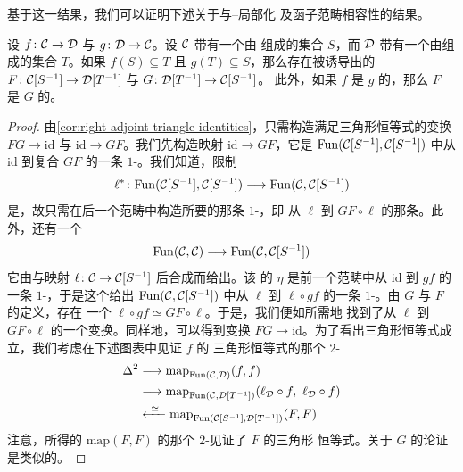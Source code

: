 基于这一结果，我们可以证明下述关于\trAdjunction{}与\trDwyer{}--\trKan{}局部化
及函子范畴相容性的结果。

\begin{proposition}\label{prop:adjunction-localization}
设 $f\colon \mathcal{C} \to \mathcal{D}$ 与 $g\colon \mathcal{D} \to \mathcal{C}$。设 $\mathcal{C}$ 带有一个由\trMorphism{}%
组成的集合 $S$，而 $\mathcal{D}$ 带有一个由\trMorphism{}组成的集合 $T$。如果
$f(S) \subseteq T$ 且 $g(T) \subseteq S$，那么存在被诱导出的\trFunctor{}%
$F\colon \mathcal{C}[S^{-1}] \to \mathcal{D}[T^{-1}]$ 与 $G\colon \mathcal{D}[T^{-1}] \to \mathcal{C}[S^{-1}]$。
此外，如果 $f$ 是 $g$ 的\trLeftAdjoint{}，那么 $F$ 是 $G$ 的\trLeftAdjoint{}。
\end{proposition}

\begin{proof}
由\cref{cor:right-adjoint-triangle-identities}，只需构造满足三角形恒等式的变换
$FG \to \mathrm{id}$ 与 $\mathrm{id} \to GF$。我们先构造映射
$\mathrm{id} \to GF$，它是 $\mathrm{Fun}(\mathcal{C}[S^{-1}], \mathcal{C}[S^{-1}])$ 中从
$\mathrm{id}$ 到复合 $GF$ 的一条 $1$-\trSimplex{}。我们知道，限制\trFunctor{}%
\[
\ell^*\colon \mathrm{Fun}(\mathcal{C}[S^{-1}], \mathcal{C}[S^{-1}])
  \longrightarrow \mathrm{Fun}(\mathcal{C}, \mathcal{C}[S^{-1}])
\]
是\trFullyFaithful{}，故只需在后一个范畴中构造所要的那条 $1$-\trSimplex{}，即
从 $\ell$ 到 $GF \circ \ell$ 的那条。此外，还有一个\trFunctor{}%
\[
\mathrm{Fun}(\mathcal{C}, \mathcal{C}) \longrightarrow \mathrm{Fun}(\mathcal{C}, \mathcal{C}[S^{-1}])
\]
它由与\trLocalization{}映射 $\ell\colon \mathcal{C} \to \mathcal{C}[S^{-1}]$ 后合成而给出。该%
\trAdjunction{}的\trUnit{} $\eta$ 是前一个范畴中从 $\mathrm{id}$ 到 $gf$ 的一条
$1$-\trSimplex{}，于是这个\trFunctor{}给出 $\mathrm{Fun}(\mathcal{C}, \mathcal{C}[S^{-1}])$ 中从
$\ell$ 到 $\ell \circ gf$ 的一条 $1$-\trSimplex{}。由 $G$ 与 $F$ 的定义，存在
一个\trEquivalence{} $\ell \circ gf \simeq GF \circ \ell$。于是，我们便如所需地
找到了从 $\ell$ 到 $GF \circ \ell$ 的一个变换。同样地，可以得到\trCounit{}变换
$FG \to \mathrm{id}$。为了看出三角形恒等式成立，我们考虑在下述图表中见证 $f$ 的
三角形恒等式的那个 $2$-\trSimplex{}%
\[
\begin{aligned}
\Delta^2 &\longrightarrow \mathrm{map}_{\mathrm{Fun}(\mathcal{C}, \mathcal{D})}(f, f) \\
&\longrightarrow
  \mathrm{map}_{\mathrm{Fun}(\mathcal{C}, \mathcal{D}[T^{-1}])}(\ell_{\mathcal{D}} \circ f,\ \ell_{\mathcal{D}} \circ f) \\
&\xleftarrow{\ \simeq\ }
  \mathrm{map}_{\mathrm{Fun}(\mathcal{C}[S^{-1}], \mathcal{D}[T^{-1}])}(F, F)
\end{aligned}
\]
注意，所得的 $\mathrm{map}(F, F)$ 的那个 $2$-\trSimplex{}见证了 $F$ 的三角形
恒等式。关于 $G$ 的论证是类似的。
\end{proof}

